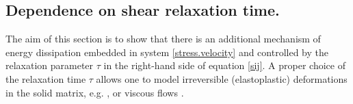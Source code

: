 \documentclass[3p,times,table]{article}
\begin{document}

\subsection{Dependence on shear relaxation time.}


The aim of this section is to show that there is an additional mechanism of 
energy dissipation embedded in system \eqref{stress.velocity} and controlled 
by the relaxation parameter $\tau$ in the right-hand side of equation
\eqref{sij}. A proper choice of the relaxation time $ \tau $ allows one to 
model 
irreversible (elastoplastic) deformations in the solid matrix, e.g. 
\cite{HYP2016,Hyper-Hypo2019}, or viscous flows \cite{DPRZ2016}.
\end{document}

